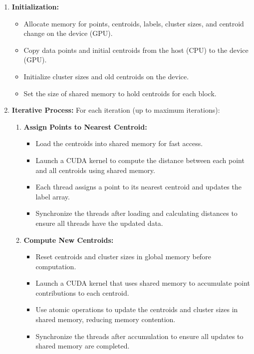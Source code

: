 \documentclass[letterpaper,12pt]{article}
\theoremstyle{remark}
\begin{document}
\begin{enumerate}
    \item \textbf{Initialization:}
    \begin{itemize}
        \item Allocate memory for points, centroids, labels, cluster sizes, and centroid change on the device (GPU).
        \item Copy data points and initial centroids from the host (CPU) to the device (GPU).
        \item Initialize cluster sizes and old centroids on the device.
        \item Set the size of shared memory to hold centroids for each block.
    \end{itemize}

    \item \textbf{Iterative Process:} For each iteration (up to maximum iterations):
    \begin{enumerate}
        \item \textbf{Assign Points to Nearest Centroid:}
        \begin{itemize}
            \item Load the centroids into shared memory for fast access.
            \item Launch a CUDA kernel to compute the distance between each point and all centroids using shared memory.
            \item Each thread assigns a point to its nearest centroid and updates the label array.
            \item Synchronize the threads after loading and calculating distances to ensure all threads have the updated data.
        \end{itemize}

        \item \textbf{Compute New Centroids:}
        \begin{itemize}
            \item Reset centroids and cluster sizes in global memory before computation.
            \item Launch a CUDA kernel that uses shared memory to accumulate point contributions to each centroid.
            \item Use atomic operations to update the centroids and cluster sizes in shared memory, reducing memory contention.
            \item Synchronize the threads after accumulation to ensure all updates to shared memory are completed.
        \end{itemize}


\end{enumerate}
\end{enumerate}
\end{document}
